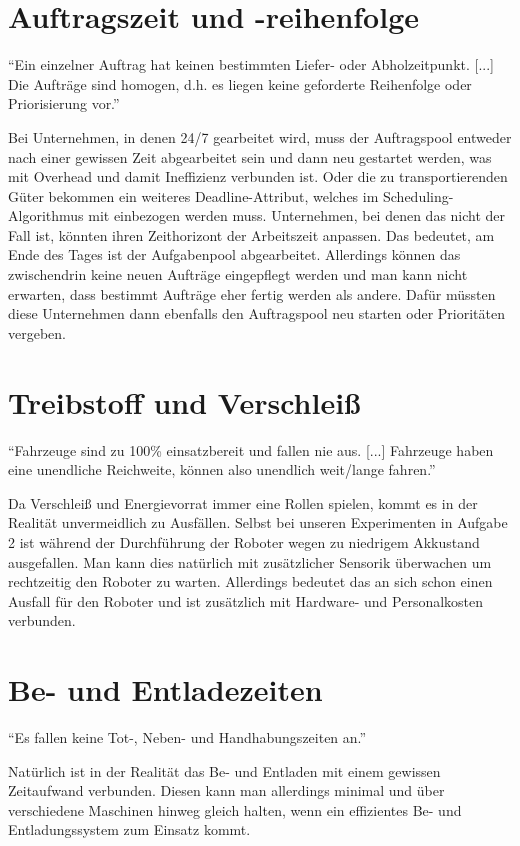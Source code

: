 \documentclass[ngerman]{tudscrreprt}
\begin{document}
\section{Auftragszeit und -reihenfolge}
\begin{displayquote}
    ``Ein einzelner Auftrag hat keinen bestimmten Liefer- oder Abholzeitpunkt. [...] Die Aufträge sind homogen, d.h. es liegen keine geforderte Reihenfolge oder Priorisierung vor.'' \cite{aufgabenstellung}
\end{displayquote}
%
Bei Unternehmen, in denen 24/7 gearbeitet wird, muss der Auftragspool entweder nach einer gewissen Zeit abgearbeitet sein und dann neu gestartet werden, was mit Overhead und damit Ineffizienz verbunden ist. Oder die zu transportierenden Güter bekommen ein weiteres Deadline-Attribut, welches im Scheduling-Algorithmus mit einbezogen werden muss. Unternehmen, bei denen das nicht der Fall ist, könnten ihren Zeithorizont der Arbeitszeit anpassen. Das bedeutet, am Ende des Tages ist der Aufgabenpool abgearbeitet. Allerdings können das zwischendrin keine neuen Aufträge eingepflegt werden und man kann nicht erwarten, dass bestimmt Aufträge eher fertig werden als andere. Dafür müssten diese Unternehmen dann ebenfalls den Auftragspool neu starten oder Prioritäten vergeben.

\section{Treibstoff und Verschleiß}
\begin{displayquote}
    ``Fahrzeuge sind zu 100\% einsatzbereit und fallen nie aus. [...] Fahrzeuge haben eine unendliche Reichweite, können also unendlich weit/lange fahren.'' \cite{aufgabenstellung}
\end{displayquote}
%
Da Verschleiß und Energievorrat immer eine Rollen spielen, kommt es in der Realität unvermeidlich zu Ausfällen. Selbst bei unseren Experimenten in Aufgabe 2 ist während der Durchführung der Roboter wegen zu niedrigem Akkustand ausgefallen. Man kann dies natürlich mit zusätzlicher Sensorik überwachen um rechtzeitig den Roboter zu warten. Allerdings bedeutet das an sich schon einen Ausfall für den Roboter und ist zusätzlich mit Hardware- und Personalkosten verbunden.

\section{Be- und Entladezeiten}
\begin{displayquote}
    ``Es fallen keine Tot-, Neben- und Handhabungszeiten an.'' \cite{aufgabenstellung}
\end{displayquote}
%
Natürlich ist in der Realität das Be- und Entladen mit einem gewissen Zeitaufwand verbunden. Diesen kann man allerdings minimal und über verschiedene Maschinen hinweg gleich halten, wenn ein effizientes Be- und Entladungssystem zum Einsatz kommt.
\end{document}
